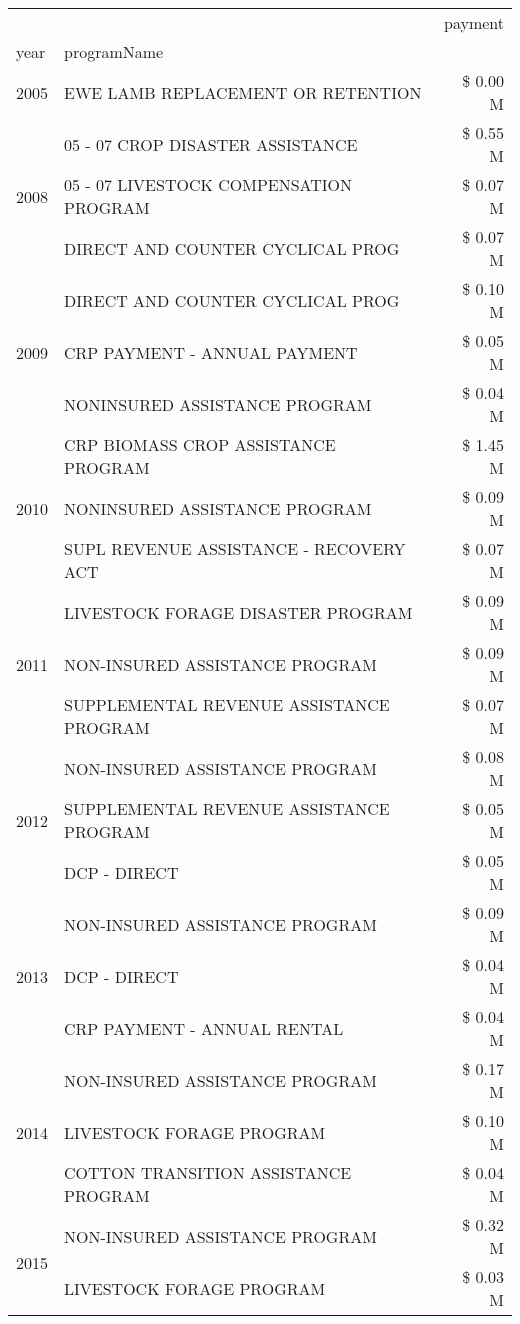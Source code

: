 \begin{tabular}{llr}
\toprule
 &  & payment \\
year & programName &  \\
\midrule
2005 & EWE LAMB REPLACEMENT OR RETENTION & \$ 0.00 M \\
\cline{1-3}
\multirow[t]{3}{*}{2008} & 05 - 07 CROP DISASTER ASSISTANCE & \$ 0.55 M \\
 & 05 - 07 LIVESTOCK COMPENSATION PROGRAM & \$ 0.07 M \\
 & DIRECT AND COUNTER CYCLICAL PROG & \$ 0.07 M \\
\cline{1-3}
\multirow[t]{3}{*}{2009} & DIRECT AND COUNTER CYCLICAL PROG & \$ 0.10 M \\
 & CRP PAYMENT - ANNUAL PAYMENT & \$ 0.05 M \\
 & NONINSURED ASSISTANCE PROGRAM & \$ 0.04 M \\
\cline{1-3}
\multirow[t]{3}{*}{2010} & CRP BIOMASS CROP ASSISTANCE PROGRAM & \$ 1.45 M \\
 & NONINSURED ASSISTANCE PROGRAM & \$ 0.09 M \\
 & SUPL REVENUE ASSISTANCE - RECOVERY ACT & \$ 0.07 M \\
\cline{1-3}
\multirow[t]{3}{*}{2011} & LIVESTOCK FORAGE DISASTER PROGRAM & \$ 0.09 M \\
 & NON-INSURED ASSISTANCE PROGRAM & \$ 0.09 M \\
 & SUPPLEMENTAL REVENUE ASSISTANCE PROGRAM & \$ 0.07 M \\
\cline{1-3}
\multirow[t]{3}{*}{2012} & NON-INSURED ASSISTANCE PROGRAM & \$ 0.08 M \\
 & SUPPLEMENTAL REVENUE ASSISTANCE PROGRAM & \$ 0.05 M \\
 & DCP - DIRECT & \$ 0.05 M \\
\cline{1-3}
\multirow[t]{3}{*}{2013} & NON-INSURED ASSISTANCE PROGRAM & \$ 0.09 M \\
 & DCP - DIRECT & \$ 0.04 M \\
 & CRP PAYMENT - ANNUAL RENTAL & \$ 0.04 M \\
\cline{1-3}
\multirow[t]{3}{*}{2014} & NON-INSURED ASSISTANCE PROGRAM & \$ 0.17 M \\
 & LIVESTOCK FORAGE PROGRAM & \$ 0.10 M \\
 & COTTON TRANSITION ASSISTANCE PROGRAM & \$ 0.04 M \\
\cline{1-3}
\multirow[t]{3}{*}{2015} & NON-INSURED ASSISTANCE PROGRAM & \$ 0.32 M \\
 & LIVESTOCK FORAGE PROGRAM & \$ 0.03 M \\

\end{tabular}
